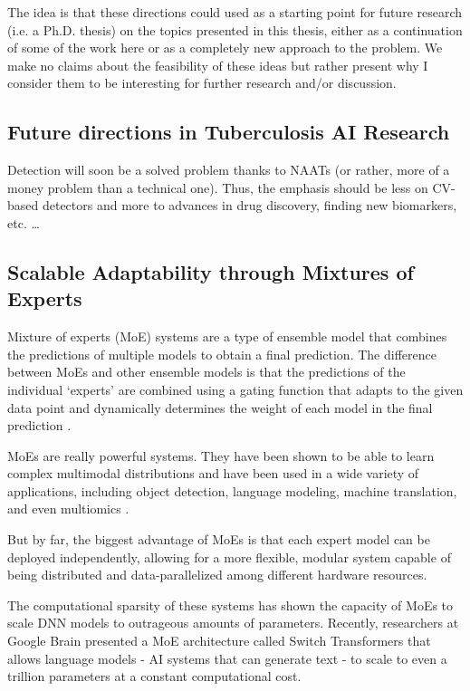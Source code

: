 \documentclass[../main.tex]{subfiles}
\begin{document}
    The idea is that these directions could used as a starting point for future research (i.e. a Ph.D. thesis) on the topics presented in this thesis, either as a continuation of some of the work here or as a completely new approach to the problem. We make no claims about the feasibility of these ideas but rather present why I consider them to be interesting for further research and/or discussion.


    \subsection{Future directions in Tuberculosis AI Research} \label{conclusions:future_work:tb_ai} 
    
    Detection will soon be a solved problem thanks to NAATs (or rather, more of a money problem than a technical one). Thus, the emphasis should be less on CV-based detectors and more to advances in drug discovery, finding new biomarkers, etc. \dots

    \clearpage


    \subsection{Scalable Adaptability through Mixtures of Experts} \label{conclusions:research_directions:moes} 

    Mixture of experts (MoE) systems are a type of ensemble model that combines the predictions of multiple models to obtain a final prediction. The difference between MoEs and other ensemble models is that the predictions of the individual `experts' are combined using a gating function that adapts to the given data point and dynamically determines the weight of each model in the final prediction \cite{chen_towards_2022}.

    MoEs are really powerful systems. They have been shown to be able to learn complex multimodal distributions and have been used in a wide variety of applications, including object detection, language modeling, machine translation, and even multiomics \cite{hwang_tutel_2023,mustafa_multimodal_2022,shazeer_outrageously_2017, minoura_scmm_2021}.
    
    But by far, the biggest advantage of MoEs is that each expert model can be deployed independently, allowing for a more flexible, modular system capable of being distributed and data-parallelized among different hardware resources. 

    The computational sparsity of these systems has shown the capacity of MoEs to scale DNN models to outrageous amounts of parameters. Recently, researchers at Google Brain presented a MoE architecture called Switch Transformers \cite{fedusSwitchTransformersScaling2022a} that allows language models - AI systems that can generate text - to scale to even a trillion parameters at a constant computational cost.
    
\end{document}
